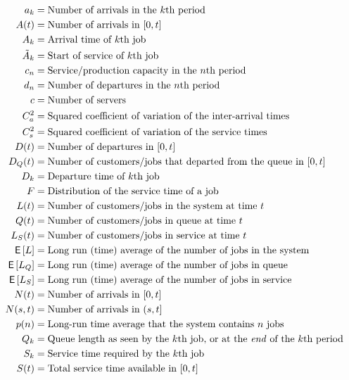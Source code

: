 \begin{align*}
 a_k &= \text{Number of arrivals in the $k$th period} \\
 A(t) &= \text{Number of arrivals in $[0,t]$} \\
 A_k &= \text{Arrival time of $k$th job} \\
 \tilde A_{k} &= \text{Start of service of $k$th job} \\
 c_n &= \text{Service/production capacity in the $n$th period} \\
 d_n &= \text{Number of departures in the $n$th period} \\
 c &= \text{Number of servers} \\
 C_a^2 &= \text{Squared coefficient of variation of the inter-arrival times} \\
 C_s^2 &= \text{Squared coefficient of variation of the service times} \\
 D(t) &= \text{Number of departures in $[0,t]$} \\
 D_Q(t) &= \text{Number of customers/jobs that departed from the queue in $[0,t]$} \\
 D_k &= \text{Departure time of $k$th job} \\
 F &= \text{Distribution of the service time of a job} \\
 L(t) &= \text{Number of customers/jobs in the system at time $t$} \\
 Q(t) &= \text{Number of customers/jobs in queue at time $t$} \\
 L_S(t) &= \text{Number of customers/jobs in service at time $t$} \\
 \E L &= \text{Long run (time) average of the number of jobs in the system} \\
 \E{L_Q} &= \text{Long run (time) average of the number of jobs in queue} \\
 \E{L_S} &= \text{Long run (time) average of the number of jobs in service} \\
 N(t) &= \text{Number of arrivals in $[0,t]$} \\
 N(s,t) &= \text{Number of arrivals in $(s,t]$} \\
 p(n) &= \text{Long-run time average that the system contains $n$ jobs} \\
 Q_k &= \text{Queue length as seen by the $k$th job, or at the \textit{end} of the $k$th period} \\
 S_k &= \text{Service time required by the $k$th job} \\
 S(t) &= \text{Total service time available in $[0,t]$} \\

\end{align*}
